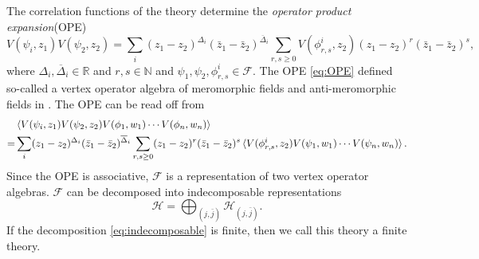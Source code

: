 \documentclass[10pt,reqno,draft]{article}
\numberwithin{equation}{section}
\numberwithin{figure}{section}
\numberwithin{table}{section}
\theoremstyle{plain}
\theoremstyle{definition}
\theoremstyle{remark}
\begin{document}
	The correlation functions of the theory determine the \emph{operator product expansion}(OPE)
	\begin{equation}\label{eq:OPE}
	  V(\psi_{i},z_1)V(\psi_2,z_2)=\sum_{i} (z_1-z_2)^{\Delta_{i}}(\bar{z}_{1}-\bar{z}_{2})^{\overline{\Delta}_{i}}\sum_{r,s\ge 0} V(\phi_{r,s}^{i},z_2)(z_1-z_2)^{r}(\bar{z}_{1}-\bar{z}_{2})^{s},
	\end{equation}
	where \(\Delta_{i},\overline{\Delta}_{i}\in \mathbb{R}\) and \(r,s \in \mathbb{N}\) and \(\psi_1,\psi_2,\phi_{r,s}^{i}\in \mathcal{F}\). The OPE \eqref{eq:OPE} defined so-called a vertex operator algebra of meromorphic fields and anti-meromorphic fields in \cite{borcherdsMonstrousMoonshineMonstrous1992,borcherdsVertexAlgebrasKacMoody1986}. The OPE can be read off from 
	\begin{equation}
		\begin{aligned}
			&\braket{ V(\psi_{i},z_1)V(\psi_2,z_2)V(\phi_1,w_1)\cdots V(\phi_n,w_{n})}\\
			=&\sum_{i} (z_1-z_2)^{\Delta_{i}}(\bar{z}_{1}-\bar{z}_{2})^{\overline{\Delta}_{i}}\sum_{r,s\ge 0} (z_1-z_2)^{r}(\bar{z}_{1}-\bar{z}_{2})^{s}\braket{V(\phi_{r,s}^{i},z_2)V(\psi_1,w_1)\cdots V(\psi_{n},w_{n})}.
		\end{aligned}
	\end{equation}
	Since the OPE is associative,  \(\mathcal{F}\) is a representation of two vertex operator algebras. \(\mathcal{F}\) can be decomposed into indecomposable representations 
	\begin{equation}\label{eq:indecomposable}
	  \mathcal{H}=\bigoplus_{(j,\bar{j})}\mathcal{H}_{(j,\bar{j})}.
	\end{equation}
	If the decomposition \eqref{eq:indecomposable} is finite, then we call this theory a finite theory.
\end{document}
